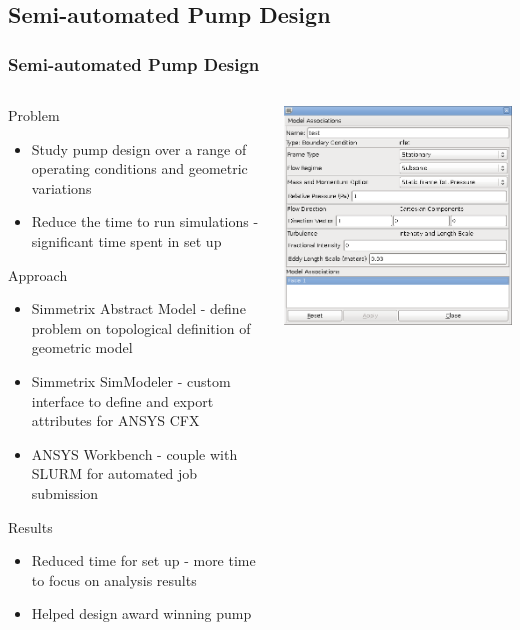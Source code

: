 \documentclass{beamer}
\begin{document}
\subsection{Semi-automated Pump Design}
\begin{frame}
  \frametitle{Semi-automated Pump Design}
  \begin{columns}
    \begin{column}{0.7\textwidth}
      Problem
      \begin{itemize}
        \item Study pump design over a range of operating conditions and
          geometric variations
        \item Reduce the time to run simulations - significant time spent in set up
      \end{itemize}
      Approach
      \begin{itemize}
        \item Simmetrix Abstract Model - define problem on topological
          definition of geometric model
        \item Simmetrix SimModeler - custom interface to define and export 
          attributes for ANSYS CFX
        \item ANSYS Workbench - couple with SLURM for automated job submission
      \end{itemize}
      Results
      \begin{itemize}
        \item Reduced time for set up - more time to focus on analysis results
        \item Helped design award winning pump
      \end{itemize}
    \end{column}
    \begin{column}{0.3\textwidth}
       \centering
       \includegraphics[width=\textwidth]{../applications/figures/simModelerInletBC.png}\\

\end{column}
\end{columns}
\end{frame}
\end{document}
